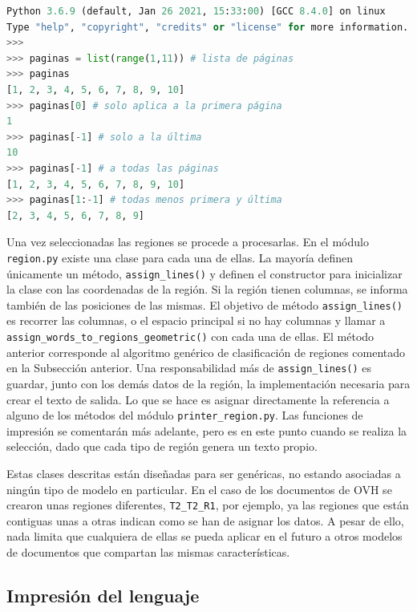 \begin{lstlisting}[language=Python,caption={Selección de regiones según las páginas},label=lst:seleccion-de-regiones-segun-pagina]
Python 3.6.9 (default, Jan 26 2021, 15:33:00) [GCC 8.4.0] on linux
Type "help", "copyright", "credits" or "license" for more information.
>>>
>>> paginas = list(range(1,11)) # lista de páginas
>>> paginas
[1, 2, 3, 4, 5, 6, 7, 8, 9, 10]
>>> paginas[0] # solo aplica a la primera página
1
>>> paginas[-1] # solo a la última
10
>>> paginas[-1] # a todas las páginas
[1, 2, 3, 4, 5, 6, 7, 8, 9, 10]
>>> paginas[1:-1] # todas menos primera y última
[2, 3, 4, 5, 6, 7, 8, 9]
\end{lstlisting}

Una vez seleccionadas las regiones se procede a procesarlas. En el módulo \verb|region.py| existe una clase para cada una de ellas. La mayoría definen únicamente un método, \verb|assign_lines()| y definen el constructor para inicializar la clase con las coordenadas de la región. Si la región tienen columnas, se informa también de las posiciones de las mismas. El objetivo de método \verb|assign_lines()| es recorrer las columnas, o el espacio principal si no hay columnas y llamar a \verb|assign_words_to_regions_geometric()| con cada una de ellas. El método anterior corresponde al algoritmo genérico de clasificación de regiones comentado en la Subsección anterior. Una responsabilidad más de \verb|assign_lines()| es guardar, junto con los demás datos de la región, la implementación necesaria para crear el texto de salida. Lo que se hace es asignar directamente la referencia a alguno de los métodos del módulo \verb|printer_region.py|. Las funciones de impresión se comentarán más adelante, pero es en este punto cuando se realiza la selección, dado que cada tipo de región genera un texto propio.

Estas clases descritas están diseñadas para ser genéricas, no estando asociadas a ningún tipo de modelo en particular. En el caso de los documentos de OVH se crearon unas regiones diferentes, \verb|T2_T2_R1|, por ejemplo, ya las regiones que están contiguas unas a otras indican como se han de asignar los datos. A pesar de ello, nada limita que cualquiera de ellas se pueda aplicar en el futuro a otros modelos de documentos que compartan las mismas características.

\subsection{Impresión del lenguaje}


